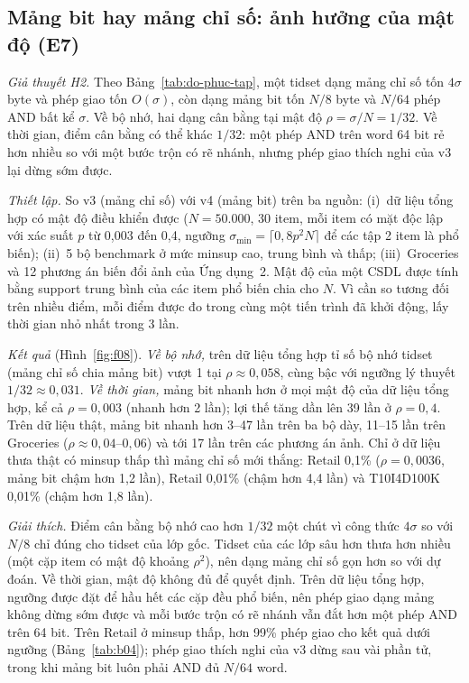 \subsection{Mảng bit hay mảng chỉ số: ảnh hưởng của mật độ (E7)}
\label{sec:e7}

\emph{Giả thuyết H2.} Theo Bảng~\ref{tab:do-phuc-tap}, một tidset dạng mảng chỉ số tốn $4\sigma$ byte và phép giao tốn $O(\sigma)$, còn dạng mảng bit tốn $N/8$ byte và $N/64$ phép AND bất kể $\sigma$. Về bộ nhớ, hai dạng cân bằng tại mật độ $\rho = \sigma/N = 1/32$. Về thời gian, điểm cân bằng có thể khác $1/32$: một phép AND trên word 64 bit rẻ hơn nhiều so với một bước trộn có rẽ nhánh, nhưng phép giao thích nghi của v3 lại dừng sớm được.

\emph{Thiết lập.} So v3 (mảng chỉ số) với v4 (mảng bit) trên ba nguồn: (i)~dữ liệu tổng hợp có mật độ điều khiển được ($N = 50.000$, 30 item, mỗi item có mặt độc lập với xác suất $p$ từ 0,003 đến 0,4, ngưỡng $\sigma_{\min} = \lceil 0{,}8 p^2 N \rceil$ để các tập 2 item là phổ biến); (ii)~5 bộ benchmark ở mức minsup cao, trung bình và thấp; (iii)~Groceries và 12 phương án biến đổi ảnh của Ứng dụng~2. Mật độ của một CSDL được tính bằng support trung bình của các item phổ biến chia cho $N$. Vì cần so tương đối trên nhiều điểm, mỗi điểm được đo trong cùng một tiến trình đã khởi động, lấy thời gian nhỏ nhất trong 3 lần.

\emph{Kết quả} (Hình~\ref{fig:f08}). \emph{Về bộ nhớ,} trên dữ liệu tổng hợp tỉ số bộ nhớ tidset (mảng chỉ số chia mảng bit) vượt 1 tại $\rho \approx 0{,}058$, cùng bậc với ngưỡng lý thuyết $1/32 \approx 0{,}031$. \emph{Về thời gian,} mảng bit nhanh hơn ở mọi mật độ của dữ liệu tổng hợp, kể cả $\rho = 0{,}003$ (nhanh hơn 2 lần); lợi thế tăng dần lên 39 lần ở $\rho = 0{,}4$. Trên dữ liệu thật, mảng bit nhanh hơn 3--47 lần trên ba bộ dày, 11--15 lần trên Groceries ($\rho \approx 0{,}04$--$0{,}06$) và tới 17 lần trên các phương án ảnh. Chỉ ở dữ liệu thưa thật có minsup thấp thì mảng chỉ số mới thắng: Retail 0,1\% ($\rho = 0{,}0036$, mảng bit chậm hơn 1,2 lần), Retail 0,01\% (chậm hơn 4,4 lần) và T10I4D100K 0,01\% (chậm hơn 1,8 lần).

\emph{Giải thích.} Điểm cân bằng bộ nhớ cao hơn $1/32$ một chút vì công thức $4\sigma$ so với $N/8$ chỉ đúng cho tidset của lớp gốc. Tidset của các lớp sâu hơn thưa hơn nhiều (một cặp item có mật độ khoảng $\rho^2$), nên dạng mảng chỉ số gọn hơn so với dự đoán. Về thời gian, mật độ không đủ để quyết định. Trên dữ liệu tổng hợp, ngưỡng được đặt để hầu hết các cặp đều phổ biến, nên phép giao dạng mảng không dừng sớm được và mỗi bước trộn có rẽ nhánh vẫn đắt hơn một phép AND trên 64 bit. Trên Retail ở minsup thấp, hơn 99\% phép giao cho kết quả dưới ngưỡng (Bảng~\ref{tab:b04}); phép giao thích nghi của v3 dừng sau vài phần tử, trong khi mảng bit luôn phải AND đủ $N/64$ word.

